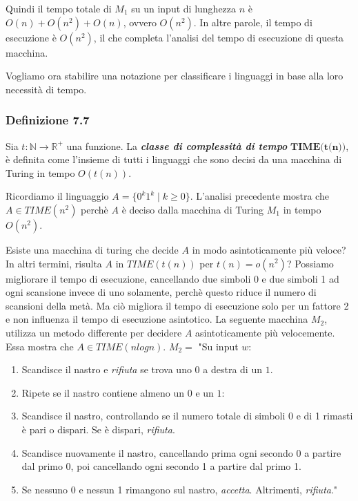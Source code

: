 \documentclass{article}
\begin{document}
Quindi il tempo totale di $M_1$ su un input di lunghezza $n$ è $O(n) + O(n^2) + O(n)$, ovvero $O(n^2)$.
In altre parole, il tempo di esecuzione è $O(n^2)$, il che completa l'analisi del tempo di esecuzione di questa macchina.

Vogliamo ora stabilire una notazione per classificare i linguaggi in base alla loro necessità di tempo.
\newline
\subsubsection*{Definizione 7.7}
\label{definizione-7.7}
\begin{tcolorbox}[colback=yellow!10!white, colframe=yellow!50!black, title=Definizione 7.7]
    Sia $t : \mathbb{N} \rightarrow \mathbb{R}^+$ una funzione.
    La \textbf{\textit{classe di complessità di tempo}} $\textbf{TIME(t(n))}$, è definita come l'insieme di tutti i linguaggi che sono decisi da una macchina di Turing in tempo $O(t(n))$.
\end{tcolorbox}
\vspace{1em}
\text{}
\newline
Ricordiamo il linguaggio $A = \{0^k1^k \mid k \geq 0\}$.
L'analisi precedente mostra che $A \in TIME(n^2)$ perchè $A$ è deciso dalla macchina di Turing $M_1$ in tempo $O(n^2)$.

Esiste una macchina di turing che decide $A$ in modo asintoticamente più veloce?
\newline
In altri termini, risulta $A$ in  $TIME(t(n))$ per $t(n) = o(n^2)$?
Possiamo migliorare il tempo di esecuzione, cancellando due simboli 0 e due simboli 1 ad ogni scansione invece di uno solamente, perchè questo riduce il numero di scansioni della metà.
Ma ciò migliora il tempo di esecuzione solo per un fattore 2 e non influenza il tempo di esecuzione asintotico.
La seguente macchina $M_2$, utilizza un metodo differente per decidere $A$ asintoticamente più velocemente.
Essa mostra che $A \in TIME(n logn)$.
\vspace{1em}
\text{}
\newline
$M_2 =$ "Su input $w$:
\begin{enumerate}
    \item Scandisce il nastro e \textit{rifiuta} se trova uno $0$ a destra di un $1$.
    \item Ripete se il nastro contiene almeno un $0$ e un $1$:
    \item \quad Scandisce il nastro, controllando se il numero totale di simboli 0 e di 1 rimasti è pari o dispari. Se è dispari, \textit{rifiuta}.
    \item \quad Scandisce nuovamente il nastro, cancellando prima ogni secondo 0 a partire dal primo 0, poi cancellando ogni secondo 1 a partire dal primo 1.
    \item Se nessuno 0 e nessun 1 rimangono sul nastro, \textit{accetta}. Altrimenti, \textit{rifiuta}."
\end{enumerate}
\end{document}
